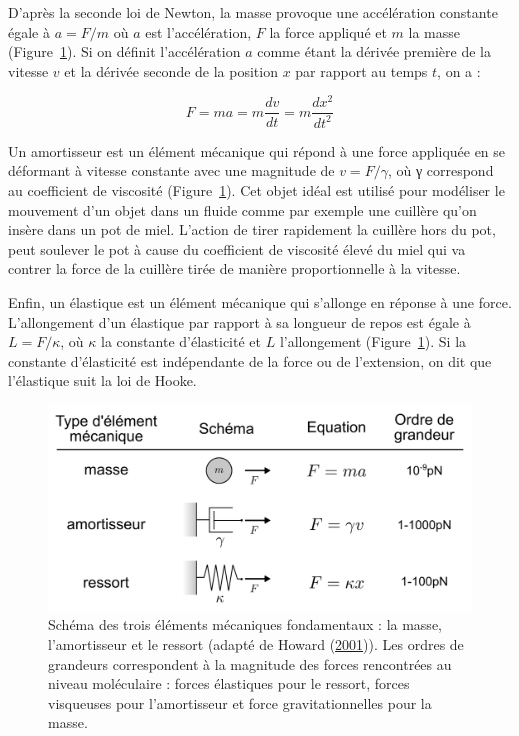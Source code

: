 \documentclass[12pt,a4paper,twoside,openright]{book}
\begin{document}
D'après la seconde loi de Newton, la masse provoque une accélération
constante égale à \(a = F/m\) où \(a\) est l'accélération, \(F\) la
force appliqué et \(m\) la masse (Figure~\ref{fig:force_types}). Si on
définit l'accélération \(a\) comme étant la dérivée première de la
vitesse \(v\) et la dérivée seconde de la position \(x\) par rapport au
temps \(t\), on a :

\[
F = ma = m\frac{dv}{dt} = m\frac{dx^2}{dt^2}
\]

Un amortisseur est un élément mécanique qui répond à une force appliquée
en se déformant à vitesse constante avec une magnitude de
\(v = F/\gamma\), où γ correspond au coefficient de viscosité
(Figure~\ref{fig:force_types}). Cet objet idéal est utilisé pour
modéliser le mouvement d'un objet dans un fluide comme par exemple une
cuillère qu'on insère dans un pot de miel. L'action de tirer rapidement
la cuillère hors du pot, peut soulever le pot à cause du coefficient de
viscosité élevé du miel qui va contrer la force de la cuillère tirée de
manière proportionnelle à la vitesse.

Enfin, un élastique est un élément mécanique qui s'allonge en réponse à
une force. L'allongement d'un élastique par rapport à sa longueur de
repos est égale à \(L = F/\kappa\), où \(\kappa\) la constante
d'élasticité et \(L\) l'allongement (Figure~\ref{fig:force_types}). Si
la constante d'élasticité est indépendante de la force ou de
l'extension, on dit que l'élastique suit la loi de Hooke.

\begin{figure}[htbp]
\centering
\includegraphics{figures/intro/force_types.png}
\caption[Schéma des trois éléments mécaniques fondamentaux]{\label{fig:force_types}Schéma
des trois éléments mécaniques fondamentaux : la masse, l'amortisseur et
le ressort (adapté de Howard (\hyperref[ref-Howard2001]{2001})). Les
ordres de grandeurs correspondent à la magnitude des forces rencontrées
au niveau moléculaire : forces élastiques pour le ressort, forces
visqueuses pour l'amortisseur et force gravitationnelles pour la masse.}
\end{figure}
\end{document}

